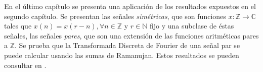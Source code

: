 En el último capítulo se presenta una aplicación de los resultados expuestos en el segundo capítulo. Se presentan las señales \textit{simétricas}, que son funciones $x : \mathbb{Z} \longrightarrow \mathbb{C}$ tales que $x(n) = x(r-n), \forall n \in \mathbb{Z}$ y $r \in \mathbb{N}$ fijo y una subclase de éstas señales, las señales \textit{pares}, que son una extensión de las funciones aritméticas pares a $\mathbb{Z}$. Se prueba que la Transformada Discreta de Fourier de una señal par se puede calcular usando las sumas de Ramanujan. Estos resultados se pueden consultar en \cite{Prand1, Sam1}.
